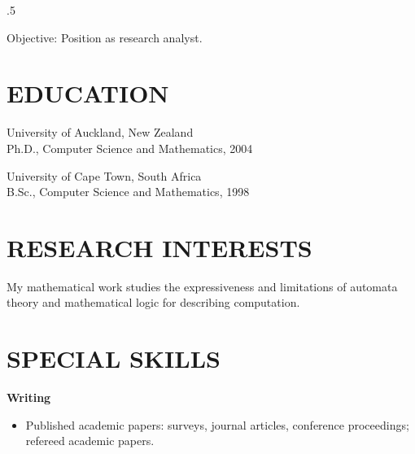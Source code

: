 \documentclass{res}
\begin{document}
 
\thispagestyle{empty} %
\address{Am Campus 1\\
Klosterneuburg 3400\\
Austria}


\begin{resume}
\vspace{0.1in}
\moveleft.5\sectionwidth\centerline{Objective: Position as research analyst.}  

\section{EDUCATION}
\vspace{0.1in} 
  
   University of Auckland, New Zealand\\
   Ph.D., Computer Science and Mathematics, 2004
    
   University of Cape Town, South Africa\\
   B.Sc., Computer Science and Mathematics, 1998
   
%
%


\section{RESEARCH INTERESTS}

My mathematical work studies the expressiveness and limitations of automata theory and mathematical logic for describing
computation.

 
 
\section{SPECIAL SKILLS} 
\vspace{0.1in}
  {\bf Writing}
    \begin{itemize} %
      \item[] Published academic papers: surveys, journal articles, conference proceedings; refereed academic papers.
      \end{itemize}


\end{resume}
\end{document}
